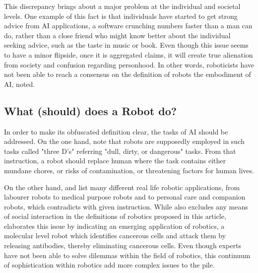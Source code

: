 \documentclass[man]{apa6}
\begin{document}

This discrepancy brings about a major problem at the individual and societal levels.
One example of this fact is that individuals have started to get strong advice from AI applications, a software crunching numbers faster than a man can do, rather than a close friend who might know better about the individual seeking advice, such as the taste in music or book.
Even though this issue seems to have a minor flipside, once it is aggregated  claims, it will create true alienation from society and confusion regarding personhood.
In other words, roboticists have not been able  to reach a consensus on the definition of robots the embodiment of AI,  noted.
\par

\subsection{What (should) does a Robot do?}
In order to make its obfuscated definition clear, the tasks of AI should be addressed.
On the one hand,   note that robots are supposedly employed in such tasks called "three D's" referring "dull, dirty, or dangerous" tasks.
From that instruction, a robot should replace human where the task contains either mundane chores, or risks of contamination, or threatening factors for human lives.
\par 
\par
On the other hand,  and  list many different real life robotic applications, from labourer robots to medical purpose robots and to personal care and companion robots, which contradicts with given instruction.
While  also excludes any means of social interaction in the definitions of robotics proposed in this article,  elaborates this issue by indicating an emerging application of robotics, a molecular level robot which identifies cancerous cells and attack them by releasing antibodies, thereby eliminating cancerous cells.
Even though experts have not been able to solve dilemmas within the field of robotics, this continuum of sophistication within robotics add more complex issues to the pile.
\par
\end{document}
